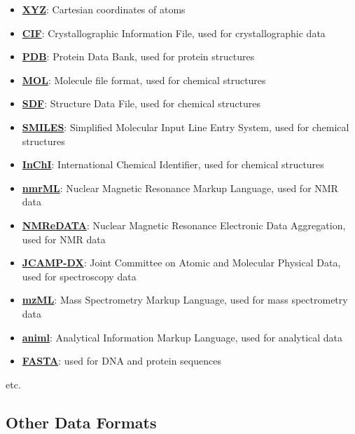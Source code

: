 \documentclass[
  letterpaper,
  DIV=11,
  numbers=noendperiod]{scrreprt}
\begin{document}
\begin{itemize}
\item
  \textbf{\href{https://en.wikipedia.org/wiki/XYZ_file_format}{XYZ}}:
  Cartesian coordinates of atoms
\item
  \textbf{\href{https://en.wikipedia.org/wiki/Crystallographic_Information_File}{CIF}}:
  Crystallographic Information File, used for crystallographic data
\item
  \textbf{\href{https://en.wikipedia.org/wiki/Protein_Data_Bank_(file_format)}{PDB}}:
  Protein Data Bank, used for protein structures
\item
  \textbf{\href{https://en.wikipedia.org/wiki/Chemical_table_file}{MOL}}:
  Molecule file format, used for chemical structures
\item
  \textbf{\href{https://en.wikipedia.org/wiki/Chemical_table_file}{SDF}}:
  Structure Data File, used for chemical structures
\item
  \textbf{\href{https://en.wikipedia.org/wiki/Simplified_molecular-input_line-entry_system}{SMILES}}:
  Simplified Molecular Input Line Entry System, used for chemical
  structures
\item
  \textbf{\href{https://en.wikipedia.org/wiki/International_Chemical_Identifier}{InChI}}:
  International Chemical Identifier, used for chemical structures
\item
  \textbf{\href{https://nmrml.org/}{nmrML}}: Nuclear Magnetic Resonance
  Markup Language, used for NMR data
\item
  \textbf{\href{https://nmredata.org/}{NMReDATA}}: Nuclear Magnetic
  Resonance Electronic Data Aggregation, used for NMR data
\item
  \textbf{\href{https://iupac.org/what-we-do/digital-standards/jcamp-dx/}{JCAMP-DX}}:
  Joint Committee on Atomic and Molecular Physical Data, used for
  spectroscopy data
\item
  \textbf{\href{https://link.springer.com/protocol/10.1007/978-1-60761-444-9_22}{mzML}}:
  Mass Spectrometry Markup Language, used for mass spectrometry data
\item
  \textbf{\href{https://www.animl.org/}{animl}}: Analytical Information
  Markup Language, used for analytical data
\item
  \textbf{\href{https://en.wikipedia.org/wiki/FASTA_format}{FASTA}}:
  used for DNA and protein sequences
\end{itemize}

etc.

\subsection*{Other Data Formats}\label{other-data-formats}
\end{document}
